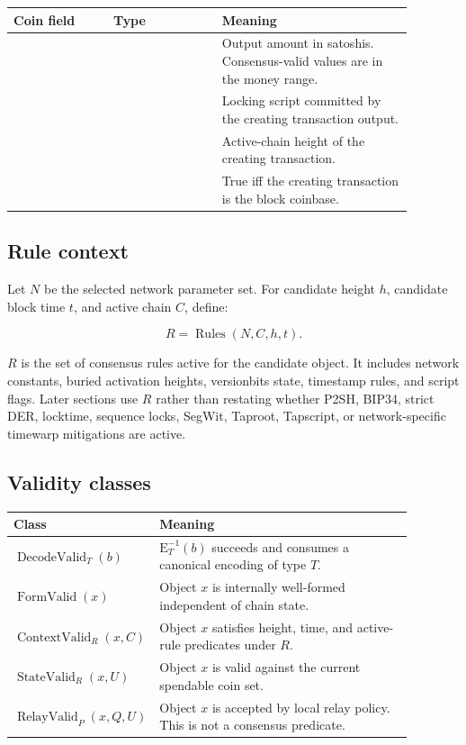 \begin{longtable}{@{}L{0.22\linewidth}L{0.24\linewidth}L{0.42\linewidth}@{}}
\toprule
Coin field & Type & Meaning \\
\midrule
{} &  & Output amount in satoshis. Consensus-valid values are in the money range. \\
 &  & Locking script committed by the creating transaction output. \\
 &  & Active-chain height of the creating transaction. \\
 &  & True iff the creating transaction is the block coinbase. \\
\bottomrule
\end{longtable}

\subsection{Rule context}

Let \(N\) be the selected network parameter set. For candidate height \(h\),
candidate block time \(t\), and active chain \(C\), define:

\[
  R = \operatorname{Rules}(N,C,h,t).
\]

\(R\) is the set of consensus rules active for the candidate object. It includes
network constants, buried activation heights, versionbits state, timestamp
rules, and script flags. Later sections use \(R\) rather than restating whether
P2SH, BIP34, strict DER, locktime, sequence locks, SegWit, Taproot, Tapscript,
or network-specific timewarp mitigations are active.

\subsection{Validity classes}

\begin{longtable}{@{}L{0.24\linewidth}L{0.64\linewidth}@{}}
\toprule
Class & Meaning \\
\midrule
\(\operatorname{DecodeValid}_{T}(b)\) & \(\mathrm{E}_{T}^{-1}(b)\) succeeds and consumes a canonical encoding of type \(T\). \\
\(\operatorname{FormValid}(x)\) & Object \(x\) is internally well-formed independent of chain state. \\
\(\operatorname{ContextValid}_{R}(x,C)\) & Object \(x\) satisfies height, time, and active-rule predicates under \(R\). \\
\(\operatorname{StateValid}_{R}(x,U)\) & Object \(x\) is valid against the current spendable coin set. \\
\(\operatorname{RelayValid}_{P}(x,Q,U)\) & Object \(x\) is accepted by local relay policy. This is not a consensus predicate. \\
\bottomrule
\end{longtable}


